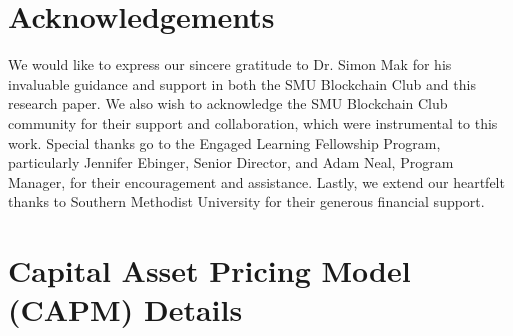 \documentclass{ledger}
\begin{document}
\section*{Acknowledgements} 

We would like to express our sincere gratitude to Dr. Simon Mak for his invaluable guidance and support in both the SMU Blockchain Club and this research paper. We also wish to acknowledge the SMU Blockchain Club community for their support and collaboration, which were instrumental to this work. Special thanks go to the Engaged Learning Fellowship Program, particularly Jennifer Ebinger, Senior Director, and Adam Neal, Program Manager, for their encouragement and assistance. Lastly, we extend our heartfelt thanks to Southern Methodist University for their generous financial support.







\newpage 	

\appendix
\setcounter{section}{0}
\section{Capital Asset Pricing Model (CAPM) Details}\label{appendix:capm_details}
\end{document}
